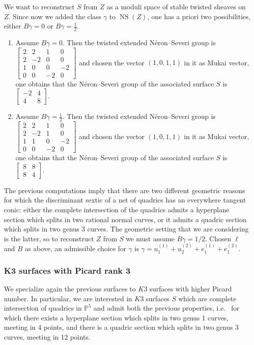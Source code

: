 \documentclass{amsart}
\theoremstyle{definition}
\numberwithin{equation}{section}
\numberwithin{equation}{section} \theoremstyle{definition}
\DeclareMathOperator{\NS}{NS}
\begin{document}
We want to reconstruct $S$ from $Z$ as a moduli space of stable twisted sheaves on $Z$. Since now we added the class $\gamma$ to $\NS(Z)$, one has a priori two possibilities, either $B\gamma=0$ or $B\gamma=\frac{1}{2}$. \begin{enumerate}\item Assume $B\gamma=0$. Then the twisted extended N\'eron--Severi group is $\left[\begin{array}{rrrr}2&2&1&0\\
2&-2&0&0\\1&0&0&-2\\0&0&-2&0\end{array}\right]$ and chosen the vector $(1,0,1,1)$ in it as Mukai vector, one obtains that the N\'eron--Severi group of the associated surface $S$ is $\left[\begin{array}{rr}-2&4\\4&8\end{array}\right]$.
\item Assume $B\gamma=\frac{1}{2}$. Then the twisted extended N\'eron--Severi group is $\left[\begin{array}{rrrr}2&2&1&0\\
2&-2&1&0\\1&1&0&-2\\0&0&-2&0\end{array}\right]$ and chosen the vector $(1,0,1,1)$ in it as Mukai vector, one obtains that the N\'eron--Severi group of the associated surface $S$ is $\left[\begin{array}{rr}8&8\\8&4\end{array}\right]$.
\end{enumerate}
The previous computations imply that there are two different geometric reasons for which the discriminant sextic of a net of quadrics has an everywhere tangent conic: either the complete intersection of the quadrics admits a hyperplane section which splits in two rational normal curves, or it admits a quadric section which splits in two genus 3 curves.
The geometric setting that we are considering is the latter, so to reconstruct $Z$ from $S$ we must assume $B\gamma=1/2$.
Chosen $\ell$ and $B$ as above, an admissible choice for $\gamma$ is $\gamma=u_1^{(1)}+u_2^{(2)}+e_1^{(1)}+e_1^{(2)}$.

\subsubsection{K3 surfaces with Picard rank 3}
We specialize again the previous surfaces to $K3$ surfaces with higher Picard number. In particular, we are  interested in $K3$ surfaces $S$ which are complete intersection of quadrics in $\mathbb{P}^5$ and admit both the previous properties, i.e.~ for which  there exists a hyperplane section which splits in two genus 1 curves, meeting in 4 points, and  there is a quadric section which splits in two genus 3 curves, meeting in 12 points. 
\end{document}
